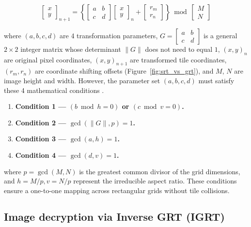 \documentclass{article}
\begin{document}
\begin{equation}
\begin{bmatrix} x \\ y \end{bmatrix}_{n+1} = 
\left\{ 
    \begin{bmatrix} a & b \\ c & d \end{bmatrix} 
    \begin{bmatrix} x \\ y \end{bmatrix}_n + 
    \begin{bmatrix} r_m \\ r_n \end{bmatrix} 
\right\} \bmod 
\begin{bmatrix} M \\ N \end{bmatrix}
\end{equation}
\label{eq:grt}

\noindent where \((a,b,c,d)\) are 4 transformation parameters, $G = \begin{bmatrix} a & b \\ c & d \end{bmatrix}$ is a general $2 \times 2$ integer matrix whose determinant $\|G\|$ does not need to equal $1$, \((x, y)_n\) are original pixel coordinates, \((x, y)_{n+1}\) are transformed tile coordinates, \((r_m, r_n)\) are coordinate shifting offsets (Figure~\ref{fig:srt_vs_grt}), and \(M\), \(N\) are image height and width. However, the parameter set \((a,b,c,d)\) must satisfy these 4 mathematical conditions \cite{Lan2025ANM}. 

\begin{enumerate}
    \item \textbf{Condition 1 --- $(b \bmod h = 0)$ or $(c \bmod v = 0)$.}
    \item \textbf{Condition 2 --- $\gcd(\|G\|, p) = 1$.}
    \item \textbf{Condition 3 --- $\gcd(a, h) = 1$.}
    \item \textbf{Condition 4 --- $\gcd(d, v) = 1$.}
\end{enumerate}
\label{4_conditions}

\noindent where $p = \gcd(M, N)$ is the greatest common divisor of the grid dimensions, and $h = M/p, v = N/p$ represent the irreducible aspect ratio. These conditions ensure a one-to-one mapping across rectangular grids without tile collisions.

\subsection{Image decryption via Inverse GRT (IGRT)}
\label{sec:IGRT}
\end{document}
